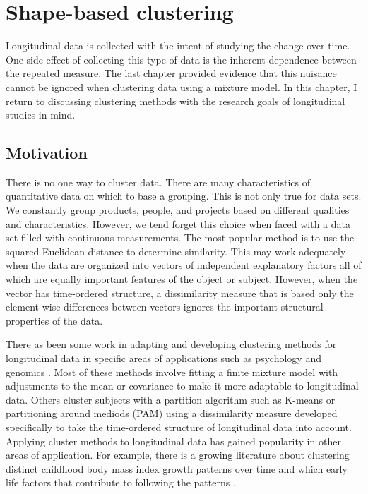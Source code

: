 \chapter{Shape-based clustering}

Longitudinal data is collected with the intent of studying the change over time. One side effect of collecting this type of data is the inherent dependence between the repeated measure. The last chapter provided evidence that this nuisance cannot be ignored when clustering data using a mixture model. In this chapter, I return to discussing clustering methods with the research goals of longitudinal studies in mind. 

\section{Motivation}
There is no one way to cluster data. There are many characteristics of quantitative data on which to base a grouping. This is not only true for data sets. We constantly group products, people, and projects based on different qualities and characteristics. However, we tend forget this choice when faced with a data set filled with continuous measurements. The most popular method is to use the squared Euclidean distance to determine similarity. This may work adequately when the data are organized into vectors of independent explanatory factors all of which are equally important features of the object or subject. However, when the vector has time-ordered structure, a dissimilarity measure that is based only the element-wise differences between vectors ignores the important structural properties of the data.  

There as been some work in adapting and developing clustering methods for longitudinal data in specific areas of applications such as psychology and genomics \cite{schneiderman1993,genolini2010, jones2001, muthen2010, mcnicholas2010}. Most of these methods involve fitting a finite mixture model with adjustments to the mean or covariance to make it more adaptable to longitudinal data. Others cluster subjects with a partition algorithm such as K-means \cite{macqueen1967,hartigan1979,} or partitioning around mediods (PAM) \cite{kaufman1990} using a dissimilarity measure developed specifically to take the time-ordered structure of longitudinal data into account. Applying cluster methods to longitudinal data has gained popularity in other areas of application. For example, there is a growing literature about clustering distinct childhood body mass index growth patterns over time and which early life factors that contribute to following the patterns \cite{pryor2011,carter2012}. 

